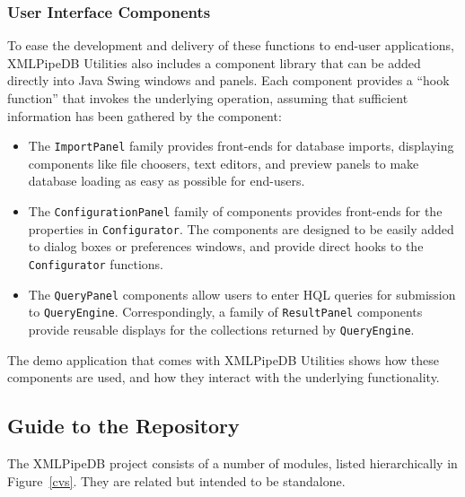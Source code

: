 \documentclass[11pt]{article}
\begin{document}
\subsubsection{User Interface Components}

To ease the development and delivery of these functions to end-user applications, XMLPipeDB Utilities also includes a component library that can be added directly into Java Swing windows and panels.  Each component provides a ``hook function'' that invokes the underlying operation, assuming that sufficient information has been gathered by the component:
\begin{itemize}
\item The \texttt{ImportPanel} family provides front-ends for database imports, displaying components like file choosers, text editors, and preview panels to make database loading as easy as possible for end-users.

\item The \texttt{ConfigurationPanel} family of components provides front-ends for the properties in \texttt{Configurator}.  The components are designed to be easily added to dialog boxes or preferences windows, and provide direct hooks to the \texttt{Configurator} functions.

\item The \texttt{QueryPanel} components allow users to enter HQL queries for submission to \texttt{QueryEngine}.  Correspondingly, a family of \texttt{ResultPanel} components provide reusable displays for the collections returned by \texttt{QueryEngine}.
\end{itemize}
The demo application that comes with XMLPipeDB Utilities shows how these components are used, and how they interact with the underlying functionality.

\subsection{Guide to the Repository}

The XMLPipeDB project consists of a number of modules, listed hierarchically in Figure~\ref{cvs}.  They are related but intended to be standalone.
\end{document}
